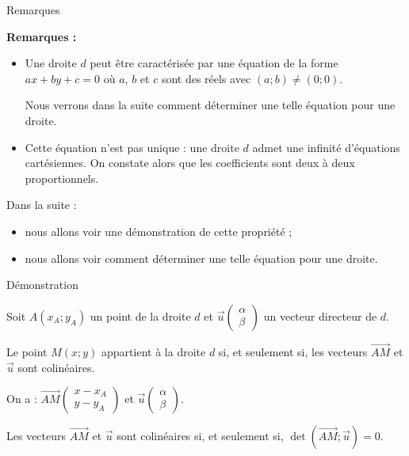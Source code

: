 \documentclass[12pt]{beamer}
\begin{document}
\begin{frame}{Remarques}

\textbf{Remarques : }

\begin{itemize}
\item Une droite $d$ peut être caractérisée par une équation de la forme $ax+by+c = 0$ où $a$, $b$ et $c$ sont des réels avec $(a;b) \neq (0;0)$. \par 
Nous verrons dans la suite comment déterminer une telle équation pour une droite. 

\item Cette équation n'est pas unique : une droite $d$ admet une infinité d'équations cartésiennes. On constate alors que les coefficients sont deux à deux proportionnels.
\end{itemize}

\end{frame}

\begin{frame}
Dans la suite :

\begin{itemize}
\item nous allons voir une démonstration de cette propriété ;
\item nous allons voir comment déterminer une telle équation pour une droite.
\end{itemize}
\end{frame}

\begin{frame}{Démonstration}

Soit $A(x_A ; y_A)$ un point de la droite $d$ et $\overrightarrow{u} \begin{pmatrix} \alpha \\ \beta \end{pmatrix}$ un vecteur directeur de $d$. 

\medskip

Le point $M(x;y)$ appartient à la droite $d$ si, et seulement si, les vecteurs $\overrightarrow{AM}$ et $\overrightarrow{u}$ sont colinéaires. 

\medskip

On a : $\overrightarrow{AM} \begin{pmatrix} x-x_A \\ y-y_A \end{pmatrix}$ et $\overrightarrow{u} \begin{pmatrix} \alpha \\ \beta \end{pmatrix}$.

\medskip

Les vecteurs $\overrightarrow{AM}$ et $\overrightarrow{u}$ sont colinéaires si, et seulement si, $\det(\overrightarrow{AM} ; \overrightarrow{u}) = 0$.

\end{frame}
\end{document}
